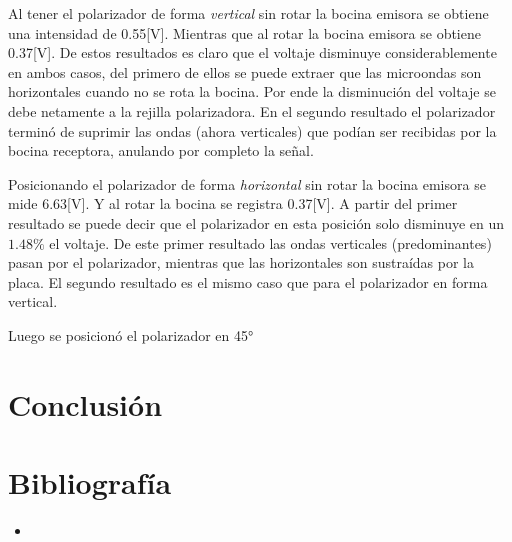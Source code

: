 \documentclass[a4paper,twocolumn,10pt]{article}
\begin{document}
Al tener el polarizador de forma \textit{vertical} sin rotar la bocina emisora se obtiene una intensidad de 0.55[V]. Mientras que al rotar la bocina emisora se obtiene 0.37[V]. De estos resultados es claro que el voltaje disminuye considerablemente en ambos casos, del primero de ellos se puede extraer que las microondas son horizontales cuando no se rota la bocina. Por ende la disminución del voltaje se debe netamente a la rejilla polarizadora. En el segundo resultado el polarizador terminó de suprimir las ondas (ahora verticales) que podían ser recibidas por la bocina receptora, anulando por completo la señal.

Posicionando el polarizador de forma \textit{horizontal} sin rotar la bocina emisora se mide 6.63[V]. Y al rotar la bocina se registra 0.37[V]. A partir del primer resultado se puede decir que el polarizador en esta posición solo disminuye en un $1.48\%$ el voltaje.
De este primer resultado las ondas verticales (predominantes) pasan por el polarizador, mientras que las horizontales son sustraídas por la placa.
El segundo resultado es el mismo caso que para el polarizador en forma vertical.

Luego se posicionó el polarizador en 45° 


\section{Conclusión}

\newpage
\section{Bibliografía}


\begin{itemize}
\item
\end{itemize}
\end{document}
